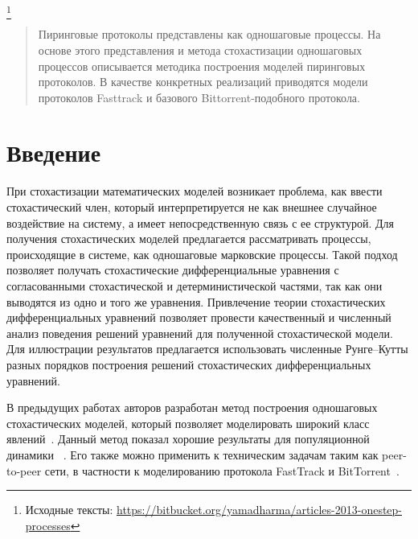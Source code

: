 \documentclass[floatfix,
showkeys,
twocolumn, nofootinbib, superscriptaddress, ]{revtex4-1}
\begin{document}
\thanks{Исходные тексты:
  \url{https://bitbucket.org/yamadharma/articles-2013-onestep-processes}}



\begin{abstract}
  Пиринговые протоколы представлены как одношаговые процессы. На
  основе этого представления и метода стохастизации одношаговых
  процессов описывается методика построения моделей пиринговых
  протоколов. В качестве конкретных реализаций приводятся модели
  протоколов Fasttrack и базового Bittorrent-подобного протокола.

\end{abstract}



\maketitle


\section{Введение}

  При стохастизации математических моделей возникает проблема, как
  ввести стохастический член, который интерпретируется не как внешнее
  случайное воздействие на систему, а имеет непосредственную связь с
  ее структурой. Для получения стохастических моделей предлагается
  рассматривать процессы, происходящие в системе, как одношаговые
  марковские процессы. Такой подход позволяет получать стохастические
  дифференциальные уравнения с согласованными стохастической и
  детерминистической частями, так как они выводятся из одно и того же
  уравнения. Привлечение теории стохастических дифференциальных
  уравнений позволяет провести качественный и численный анализ
  поведения решений уравнений для полученной стохастической модели.
  Для иллюстрации результатов предлагается использовать численные
  Рунге--Кутты разных порядков построения решений стохастических
  дифференциальных уравнений.

  В предыдущих работах авторов разработан метод построения одношаговых
  стохастических моделей, который позволяет моделировать широкий класс
  явлений~\cite{L_lit13, L_lit10}. Данный метод показал хорошие
  результаты для популяционной динамики~\cite{L_lit14, L_lit12,
    L_lit11} . Его также можно применить к техническим задачам таким
  как peer-to-peer сети, в частности к моделированию протокола
  FastTrack и BitTorrent~\cite{kulyabov:2013:conference:mephi}.
\end{document}

